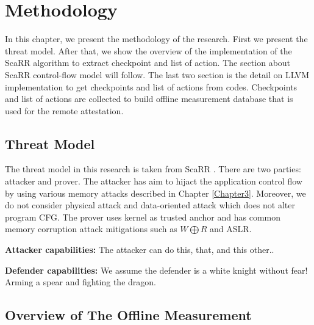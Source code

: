 
\chapter{Methodology} %

\label{Chapter4} %

In this chapter, we present the methodology of the research. First we present 
the threat model. 
After that, we show the overview of the implementation of the 
ScaRR algorithm to extract checkpoint and list of action. The section about 
ScaRR control-flow model will follow. The last two section is the detail on 
LLVM implementation to get checkpoints and list of actions from codes. 
Checkpoints and list of actions are collected to build offline measurement 
database that is used for the remote attestation.

\section{Threat Model}

The threat model in this research is taken from ScaRR
\cite{toffaliniScaRRScalableRuntime2019}. There are two parties: attacker and 
prover. The attacker has aim to hijact the application control flow by using 
various memory attacks described in Chapter \ref{Chapter3}.
Moreover, we do not consider physical attack and data-oriented attack which 
does not alter program CFG.
The prover uses kernel as trusted anchor and has common memory corruption 
attack mitigations such as \( W \bigoplus R \) and ASLR. 

\vspace{0.5cm}
\noindent \textbf{Attacker capabilities:}
The attacker can do this, that, and this other..

\vspace{0.5cm}
\noindent \textbf{Defender capabilities:}
We assume the defender is a white knight without fear! Arming a spear and 
fighting the dragon.


\section{Overview of The Offline Measurement}\
\label{sec:overview}

